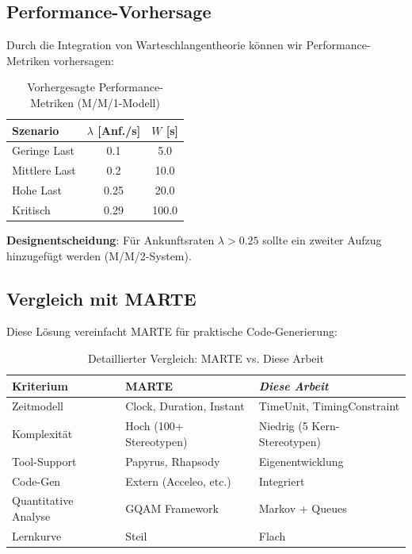 ﻿\documentclass[a4paper,12pt]{scrreprt}
\theoremstyle{definition}
\begin{document}
\subsection{Performance-Vorhersage}

Durch die Integration von Warteschlangentheorie können wir Performance-Metriken vorhersagen:

\begin{table}[h]
	\centering
	\begin{tabular}{@{}lcc@{}}
		\toprule
		\textbf{Szenario} & \textbf{$\lambda$ [Anf./s]} & \textbf{$W$ [s]} \\
		\midrule
		Geringe Last & 0.1 & 5.0 \\
		Mittlere Last & 0.2 & 10.0 \\
		Hohe Last & 0.25 & 20.0 \\
		Kritisch & 0.29 & 100.0 \\
		\bottomrule
	\end{tabular}
	\caption{Vorhergesagte Performance-Metriken (M/M/1-Modell)}
	\label{tab:performance-prediction}
\end{table}

\textbf{Designentscheidung}: Für Ankunftsraten $\lambda > 0.25$ sollte ein zweiter Aufzug hinzugefügt werden (M/M/2-System).

\subsection{Vergleich mit MARTE}

Diese Lösung vereinfacht MARTE für praktische Code-Generierung:

\begin{table}[h]
	\centering
	\begin{tabular}{@{}lll@{}}
		\toprule
		\textbf{Kriterium} & \textbf{MARTE} & \textbf{\textit{Diese Arbeit}} \\
		\midrule
		Zeitmodell & Clock, Duration, Instant & TimeUnit, TimingConstraint \\
		Komplexität & Hoch (100+ Stereotypen) & Niedrig (5 Kern-Stereotypen) \\
		Tool-Support & Papyrus, Rhapsody & Eigenentwicklung \\
		Code-Gen & Extern (Acceleo, etc.) & Integriert \\
		Quantitative Analyse & GQAM Framework & Markov + Queues \\
		Lernkurve & Steil & Flach \\
		\bottomrule
	\end{tabular}
	\caption{Detaillierter Vergleich: MARTE vs. Diese Arbeit}
	\label{tab:marte-detailed}
\end{table}
\end{document}
